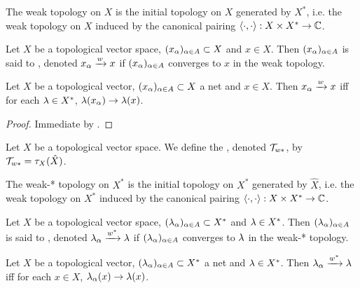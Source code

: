 \documentclass{book}
\begin{document}
	\begin{note}
		The weak topology on $X$ is the  initial topology on $X$ generated by $X^*$, i.e. the weak topology on $X$ induced by the canonical pairing $\langle \cdot, \cdot \rangle: X \times X^* \rightarrow \mathbb{C}$.
	\end{note}

	\begin{defn}
		Let $X$ be a topological vector space, $(x_{\alpha})_{\alpha \in A} \subset X$ and $x \in X$. Then $(x_{\alpha})_{\alpha \in A}$ is said to , denoted $x_{\alpha} \xrightarrow{w} x$ if $(x_{\alpha})_{\alpha \in A}$ converges to $x$ in the weak topology.
	\end{defn}
	
	\begin{ex} \lex{}
		Let $X$ be a topological vector, $(x_{\alpha})_{\alpha \in A} \subset X$ a net and $x \in X$. Then $x_{\alpha} \xrightarrow{w} x$ iff for each $\lambda \in X^*$, $ \lambda (x_{\alpha}) \rightarrow \lambda(x)$. 
	\end{ex}
	
	\begin{proof}
		Immediate by \rex{ex:nets:0020}.
	\end{proof}
	
	\begin{defn}
		Let $X$ be a topological vector space. We define the , denoted $\mathcal{T}_{w*}$, by $\mathcal{T}_{w*} = \tau_X(\hat{X})$. 
	\end{defn}
	
	\begin{note}
		The weak-* topology on $X^*$ is the initial topology on $X^*$ generated by $\hat{X}$, i.e. the weak topology on $X^*$ induced by the canonical pairing $\langle \cdot, \cdot \rangle: X \times X^* \rightarrow \mathbb{C}$.
	\end{note}
	
	\begin{defn}
		Let $X$ be a topological vector space, $(\lambda_{\alpha})_{\alpha \in A} \subset X^*$ and $\lambda \in X^*$. Then $(\lambda_{\alpha})_{\alpha \in A}$ is said to , denoted $\lambda_{\alpha} \xrightarrow{w^*} \lambda$ if $(\lambda_{\alpha})_{\alpha \in A}$ converges to $\lambda$ in the weak-* topology.
	\end{defn}
	
	\begin{ex} \lex{}
		Let $X$ be a topological vector, $(\lambda_{\alpha})_{\alpha \in A} \subset X^*$ a net and $\lambda \in X^*$. Then $\lambda_{\alpha} \xrightarrow{w^*} \lambda$ iff for each $x \in X$, $ \lambda_{\alpha} (x) \rightarrow \lambda(x)$. 
	\end{ex}
	
\end{document}
